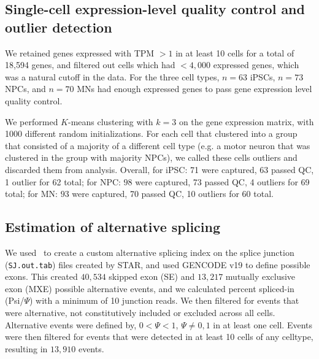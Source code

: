 
\subsection{Single-cell expression-level quality control and outlier detection}

We retained genes expressed with TPM $> 1$ in at least 10 cells for a total of 18,594 genes, and filtered out cells which had $<4,000$ expressed genes, which was a natural cutoff in the data. For the three cell types, $n=63$ iPSCs, $n=73$ NPCs, and $n=70$ MNs had enough expressed genes to pass gene expression level quality control.


We performed $K$-means clustering with $k=3$ on the gene expression matrix, with 1000 different random initializations. For each cell that clustered into a group that consisted of a majority of a different cell type (e.g. a motor neuron that was clustered in the group with majority NPCs), we called these cells outliers and discarded them from analysis. Overall, for iPSC: 71 were captured, 63 passed  QC,  1 outlier for 62 total; for NPC: $98$ were captured, 73 passed QC, 4 outliers for 69 total; for MN: $93$ were captured,  70 passed QC, 10 outliers for 60 total.



\subsection{Estimation of alternative splicing}
We used \outrigger\, to create a custom alternative splicing index on the splice junction (\texttt{SJ.out.tab}) files created by STAR, and used GENCODE v19 to define possible exons. This created $40,534$ skipped exon (SE) and $13,217$ mutually exclusive exon (MXE) possible alternative events, and we calculated percent spliced-in (Psi/$\Psi$) with a minimum of 10 junction reads. We then filtered for events that were alternative, not constitutively included or excluded across all cells. Alternative events were defined by, $0 < \Psi < 1$, $\Psi \neq 0, 1$ in at least one cell. Events were then filtered for events that were detected in at least 10 cells of any celltype, resulting in $13,910$ events.

